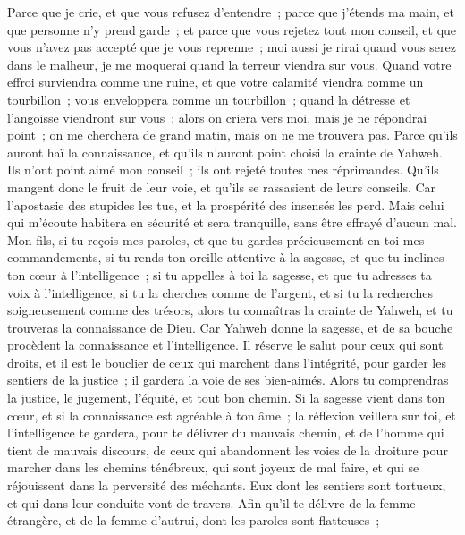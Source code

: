 \begin{multicols}{2}
Parce que je crie, et que vous refusez d'entendre~; parce que j'étends ma main, et que personne n'y prend garde~;
et parce que vous rejetez tout mon conseil, et que vous n'avez pas accepté que je vous reprenne~;
moi aussi je rirai quand vous serez dans le malheur, je me moquerai quand la terreur viendra sur vous.
Quand votre effroi surviendra comme une ruine, et que votre calamité viendra comme un tourbillon~; vous enveloppera comme un tourbillon~; quand la détresse et l'angoisse viendront sur vous~;
alors on criera vers moi, mais je ne répondrai point~; on me cherchera de grand matin, mais on ne me trouvera pas.
Parce qu'ils auront haï la connaissance, et qu'ils n'auront point choisi la crainte de Yahweh.
Ils n'ont point aimé mon conseil~; ils ont rejeté toutes mes réprimandes.
Qu'ils mangent donc le fruit de leur voie, et qu'ils se rassasient de leurs conseils.
Car l'apostasie des stupides les tue, et la prospérité des insensés les perd.
Mais celui qui m'écoute habitera en sécurité et sera tranquille, sans être effrayé d'aucun mal.
\VerseOne{}Mon fils, si tu reçois mes paroles, et que tu gardes précieusement en toi mes commandements,
si tu rends ton oreille attentive à la sagesse, et que tu inclines ton cœur à l'intelligence~;
si tu appelles à toi la sagesse, et que tu adresses ta voix à l'intelligence,
si tu la cherches comme de l'argent, et si tu la recherches soigneusement comme des trésors,
alors tu connaîtras la crainte de Yahweh, et tu trouveras la connaissance de Dieu.
Car Yahweh donne la sagesse, et de sa bouche procèdent la connaissance et l'intelligence.
Il réserve le salut pour ceux qui sont droits, et il est le bouclier de ceux qui marchent dans l'intégrité,
pour garder les sentiers de la justice~; il gardera la voie de ses bien-aimés.
Alors tu comprendras la justice, le jugement, l'équité, et tout bon chemin.
Si la sagesse vient dans ton cœur, et si la connaissance est agréable à ton âme~;
la réflexion veillera sur toi, et l'intelligence te gardera,
pour te délivrer du mauvais chemin, et de l'homme qui tient de mauvais discours,
de ceux qui abandonnent les voies de la droiture pour marcher dans les chemins ténébreux,
qui sont joyeux de mal faire, et qui se réjouissent dans la perversité des méchants.
Eux dont les sentiers sont tortueux, et qui dans leur conduite vont de travers.
Afin qu'il te délivre de la femme étrangère, et de la femme d'autrui, dont les paroles sont flatteuses~;

\end{multicols}
